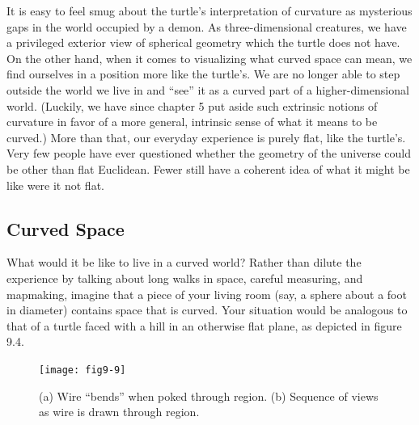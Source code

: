 \documentclass{book}
\begin{document}
It is easy to feel smug about the turtle's interpretation of curvature as
mysterious gaps in the world occupied by a demon. As three-dimensional
creatures, we have a privileged exterior view of spherical geometry which
the turtle does not have. On the other hand, when it comes to visualizing
what curved space can mean, we find ourselves in a position more like
the turtle's. We are no longer able to step outside the world we live in
and ``see'' it as a curved part of a higher-dimensional world. (Luckily, we
have since chapter 5 put aside such extrinsic notions of curvature in favor
of a more general, intrinsic sense of what it means to be curved.) More
than that, our everyday experience is purely flat, like the turtle's. Very
few people have ever questioned whether the geometry of the universe
could be other than flat Euclidean. Fewer still have a coherent idea of
what it might be like were it not flat.

\subsection{Curved Space}

What would it be like to live in a curved world? Rather than dilute
the experience by talking about long walks in space, careful measuring,
and mapmaking, imagine that a piece of your living room (say, a sphere
about a foot in diameter) contains space that is curved. Your situation
would be analogous to that of a turtle faced with a hill in an otherwise
flat plane, as depicted in figure 9.4.

\begin{figure}
\begin{center}
\texttt{[image: fig9-9]}
\caption{(a) Wire ``bends'' when poked through region. (b) Sequence of views as wire is drawn through region.}
\end{center}
\end{figure}
\end{document}
